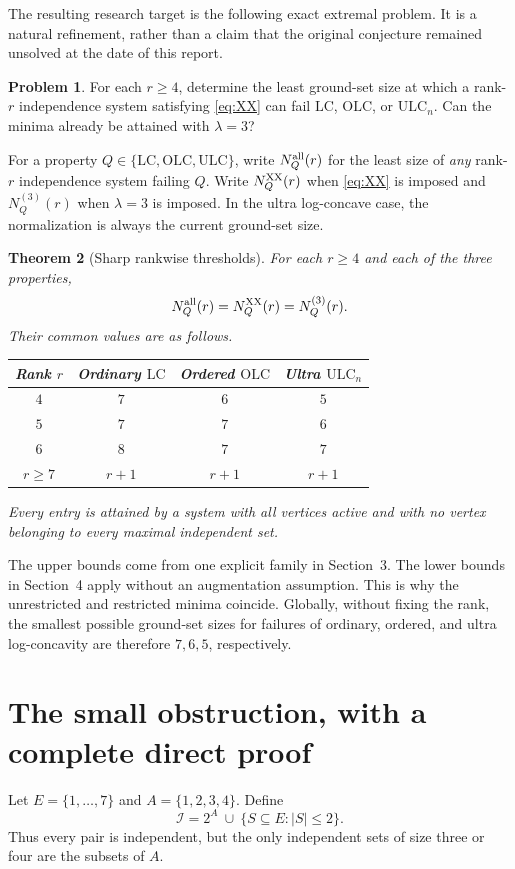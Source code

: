 \documentclass[11pt,letterpaper]{article}
\numberwithin{equation}{section}
\newtheorem{theorem}{Theorem}[section]
\theoremstyle{definition}
\newtheorem{problem}[theorem]{Problem}
\theoremstyle{remark}
\newcommand{\I}{\mathcal I}
\newcommand{\LC}{\mathrm{LC}}
\newcommand{\OLC}{\mathrm{OLC}}
\newcommand{\ULC}{\mathrm{ULC}}
\begin{document}
The resulting research target is the following exact extremal problem.
It is a natural refinement, rather than a claim that the original conjecture
remained unsolved at the date of this report.

\begin{problem}\label{prob:sharp}
For each $r\ge4$, determine the least ground-set size at which a rank-$r$
independence system satisfying \eqref{eq:XX} can fail $\LC$, $\OLC$, or
$\ULC_n$. Can the minima already be attained with $\lambda=3$?
\end{problem}

For a property $Q\in\{\LC,\OLC,\ULC\}$, write $N_Q^{\rm all}(r)$ for the
least size of \emph{any} rank-$r$ independence system failing $Q$.
Write $N_Q^{\rm XX}(r)$ when \eqref{eq:XX} is imposed and
$N_Q^{(3)}(r)$ when $\lambda=3$ is imposed. In the ultra log-concave case,
the normalization is always the current ground-set size.

\begin{theorem}[Sharp rankwise thresholds]\label{thm:main}
For each $r\ge4$ and each of the three properties,
\[
 N_Q^{\rm all}(r)=N_Q^{\rm XX}(r)=N_Q^{(3)}(r).
\]
Their common values are as follows.
\begin{center}
\begin{tabular}{@{}c c c c@{}}
\toprule
Rank $r$ & Ordinary $\LC$ & Ordered $\OLC$ & Ultra $\ULC_n$\\
\midrule
$4$ & $7$ & $6$ & $5$\\
$5$ & $7$ & $7$ & $6$\\
$6$ & $8$ & $7$ & $7$\\
$r\ge7$ & $r+1$ & $r+1$ & $r+1$\\
\bottomrule
\end{tabular}
\end{center}
Every entry is attained by a system with all vertices active and with no
vertex belonging to every maximal independent set.
\end{theorem}

The upper bounds come from one explicit family in Section~3. The lower
bounds in Section~4 apply without an augmentation assumption. This is why
the unrestricted and restricted minima coincide. Globally, without fixing
the rank, the smallest possible ground-set sizes for failures of ordinary,
ordered, and ultra log-concavity are therefore $7,6,5$, respectively.

\section{The small obstruction, with a complete direct proof}
\label{sec:small}
Let $E=\{1,\ldots,7\}$ and $A=\{1,2,3,4\}$. Define
\begin{equation}\label{eq:seven}
 \I=2^A\ \cup\ \{S\subseteq E:|S|\le2\}.
\end{equation}
Thus every pair is independent, but the only independent sets of size
three or four are the subsets of $A$.
\end{document}
